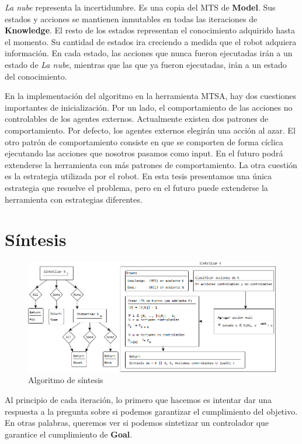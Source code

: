 \vspace{\baselineskip}
\textit{La nube} representa la incertidumbre. Es una copia del MTS de \textbf{Model}. Sus estados y acciones se mantienen inmutables en todas las 
iteraciones de \textbf{Knowledge}.
El resto de los estados representan el conocimiento adquirido hasta el momento. Su cantidad de estados ira creciendo a medida que el robot adquiera información.
En cada estado, las acciones que nunca fueron ejecutadas irán a un estado de \textit{La nube}, mientras que las que ya fueron ejecutadas, irán a un estado del
conocimiento.

\vspace{\baselineskip}
En la implementación del algoritmo en la herramienta MTSA, hay dos cuestiones importantes de inicialización.
Por un lado, el comportamiento de las acciones no controlables de los agentes externos. Actualmente existen dos patrones de comportamiento.
Por defecto, los agentes externos elegirán una acción al azar. El otro patrón de comportamiento consiste en que se comporten de forma cíclica ejecutando
las acciones que nosotros pasamos como input. En el futuro podrá extenderse la herramienta con más patrones de comportamiento.
La otra cuestión es la estrategia utilizada por el robot. En esta tesis presentamos una única estrategia que resuelve el problema, pero en el futuro puede
extenderse la herramienta con estrategias diferentes.

\section{Síntesis}

\begin{figure}[H]
  \centering
    \includegraphics[width=1.0\textwidth]{Imagenes/Algoritmo/Algoritmo_sintetizar.png}
  \caption{Algoritmo de síntesis}
  \label{fig:Algoritmo_sintetizar}
\end{figure}

Al principio de cada iteración, lo primero que hacemos es intentar dar una respuesta a la pregunta sobre si podemos garantizar el cumplimiento del objetivo.
En otras palabras, queremos ver si podemos sintetizar un controlador que garantice el cumplimiento de \textbf{Goal}.

